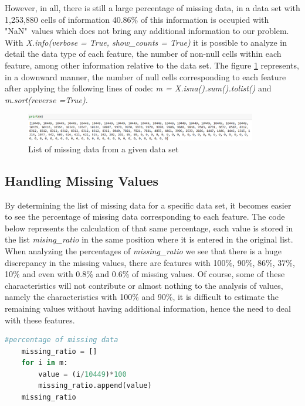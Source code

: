 However, in all, there is still a large percentage of missing data, in a data set with 1,253,880 cells of information 40.86\% of this information is occupied with "NaN"\ values which does not bring any additional information to our problem. With \textit{X.info(verbose = True, show\_counts = True)} it is possible to analyze in detail the data type of each feature, the number of non-null cells within each feature, among other information relative to the data set. The figure \ref{fig:missing_values} represents, in a downward manner, the number of null cells corresponding to each feature after applying the following lines of code: \textit{m = X.isna().sum().tolist()} and \textit{m.sort(reverse =True)}. 

\begin{figure}[h]
    \centering
    \includegraphics[width=0.9\textwidth,height=0.1\textheight]{Chapters/Figures/missing_values.png}
    \caption{List of missing data from a given data set}
    \label{fig:missing_values}
\end{figure}




\subsection{Handling Missing Values} %
\label{sec:handling_missing values}
\hspace{10px}By determining the list of missing data for a specific data set, it becomes easier to see the percentage of missing data corresponding to each feature. The code below represents the calculation of that same percentage, each value is stored in the list \textit{mising\_ratio} in the same position where it is entered in the original list. When analyzing the percentages of \textit{missing\_ratio} we see that there is a huge discrepancy in the missing values, there are features with 100\%, 90\%, 86\%, 37\%, 10\% and even with 0.8\% and 0.6\% of missing values. Of course, some of these characteristics will not contribute or almost nothing to the analysis of values, namely the characteristics with 100\% and 90\%, it is difficult to estimate the remaining values without having additional information, hence the need to deal with these features.
\begin{lstlisting}[language=Python]
#percentage of missing data 
    missing_ratio = []
    for i in m:
        value = (i/10449)*100
        missing_ratio.append(value)
    missing_ratio
\end{lstlisting}

